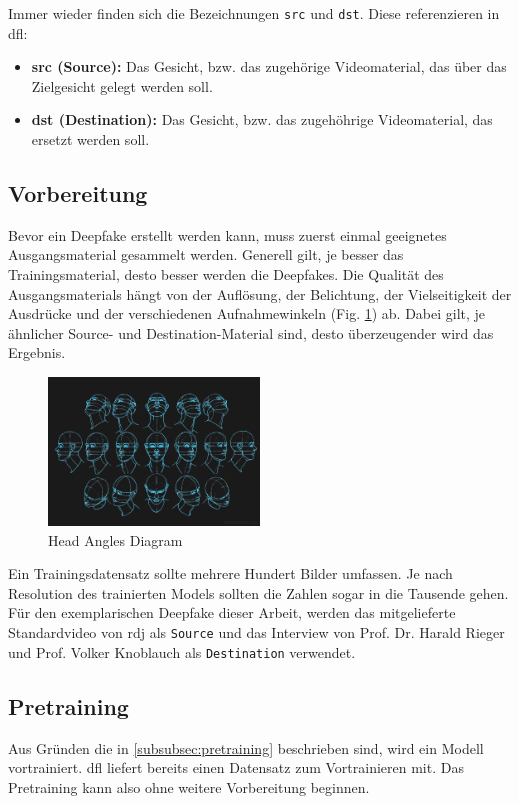 Immer wieder finden sich die Bezeichnungen \texttt{src} und \texttt{dst}.
Diese referenzieren in \gls{dfl}:
\begin{itemize}
    \item \textbf{src (Source):} Das Gesicht, bzw. das zugehörige Videomaterial, das über das Zielgesicht gelegt werden soll.
    \item \textbf{dst (Destination):} Das Gesicht, bzw. das zugehöhrige Videomaterial, das ersetzt werden soll.
\end{itemize}

\subsection{Vorbereitung}\label{subsec:vorbereitung}
Bevor ein Deepfake erstellt werden kann, muss zuerst einmal geeignetes Ausgangsmaterial gesammelt werden.
Generell gilt, je besser das Trainingsmaterial, desto besser werden die Deepfakes.
Die Qualität des Ausgangsmaterials hängt von der Auflösung, der Belichtung, der Vielseitigkeit der Ausdrücke und der verschiedenen Aufnahmewinkeln (Fig. \ref{fig:head-angles-diagram}) ab.
Dabei gilt, je ähnlicher Source- und Destination-Material sind, desto überzeugender wird das Ergebnis.
\begin{figure}
    \center
    \includegraphics[width=0.5\textwidth]{Bilder/DFL/Human_Head_Angles_Diagram}
    \caption{Head Angles Diagram}
    \label{fig:head-angles-diagram}
\end{figure}

Ein Trainingsdatensatz sollte mehrere Hundert Bilder umfassen.
Je nach Resolution des trainierten Models sollten die Zahlen sogar in die Tausende gehen.\\[0.5cm]

Für den exemplarischen Deepfake dieser Arbeit, werden das mitgelieferte Standardvideo von \gls{rdj} als \texttt{Source} und das Interview von Prof. Dr. Harald Rieger und Prof. Volker Knoblauch als \texttt{Destination} verwendet.

\subsection{Pretraining}\label{subsec:pretraining}
Aus Gründen die in \ref{subsubsec:pretraining} beschrieben sind, wird ein Modell vortrainiert.
\gls{dfl} liefert bereits einen Datensatz zum Vortrainieren mit.
Das Pretraining kann also ohne weitere Vorbereitung beginnen.
